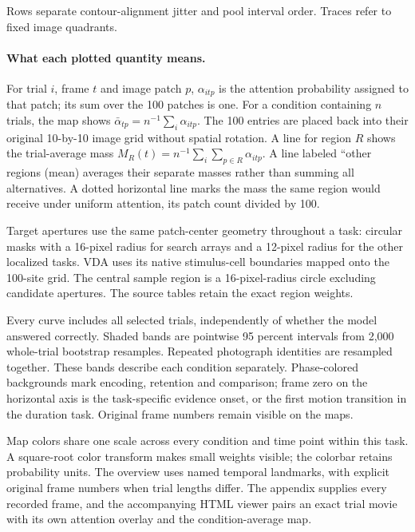 \documentclass[11pt]{article}
\begin{document}
Rows separate contour-alignment jitter and pool interval order. Traces refer to fixed image quadrants.

\paragraph{What each plotted quantity means.}
For trial $i$, frame $t$ and image patch $p$, $\alpha_{itp}$ is the attention probability assigned to that patch; its sum over the 100 patches is one. For a condition containing $n$ trials, the map shows $\bar\alpha_{tp}=n^{-1}\sum_i\alpha_{itp}$. The 100 entries are placed back into their original 10-by-10 image grid without spatial rotation. A line for region $R$ shows the trial-average mass $M_R(t)=n^{-1}\sum_i\sum_{p\in R}\alpha_{itp}$. A line labeled ``other regions (mean) averages their separate masses rather than summing all alternatives. A dotted horizontal line marks the mass the same region would receive under uniform attention, its patch count divided by 100.

Target apertures use the same patch-center geometry throughout a task: circular masks with a 16-pixel radius for search arrays and a 12-pixel radius for the other localized tasks. VDA uses its native stimulus-cell boundaries mapped onto the 100-site grid. The central sample region is a 16-pixel-radius circle excluding candidate apertures. The source tables retain the exact region weights.

Every curve includes all selected trials, independently of whether the model answered correctly. Shaded bands are pointwise 95 percent intervals from 2,000 whole-trial bootstrap resamples. Repeated photograph identities are resampled together. These bands describe each condition separately. Phase-colored backgrounds mark encoding, retention and comparison; frame zero on the horizontal axis is the task-specific evidence onset, or the first motion transition in the duration task. Original frame numbers remain visible on the maps.

Map colors share one scale across every condition and time point within this task. A square-root color transform makes small weights visible; the colorbar retains probability units. The overview uses named temporal landmarks, with explicit original frame numbers when trial lengths differ. The appendix supplies every recorded frame, and the accompanying HTML viewer pairs an exact trial movie with its own attention overlay and the condition-average map.
\end{document}
